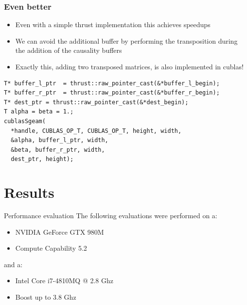 \documentclass{beamer}
\begin{document}
\begin{frame}[fragile]
  \frametitle{Even better}
  \begin{itemize}
    \item Even with a simple thrust implementation this achieves speedups
    \item We can avoid the additional buffer by performing the transposition
      during the addition of the causality buffers
    \item Exactly this, adding two transposed matrices, is also implemented
      in cublas!
  \end{itemize}
  \begin{lstlisting}[basicstyle=\tiny]
T* buffer_l_ptr  = thrust::raw_pointer_cast(&*buffer_l_begin);
T* buffer_r_ptr  = thrust::raw_pointer_cast(&*buffer_r_begin);
T* dest_ptr = thrust::raw_pointer_cast(&*dest_begin);
T alpha = beta = 1.;
cublasSgeam(
  *handle, CUBLAS_OP_T, CUBLAS_OP_T, height, width,
  &alpha, buffer_l_ptr, width,
  &beta, buffer_r_ptr, width,
  dest_ptr, height);
  \end{lstlisting}
\end{frame}

\section{Results} 
\begin{frame}{Performance evaluation}
  The following evaluations were performed on a:
  \begin{itemize}
    \item NVIDIA GeForce GTX 980M
    \item Compute Capability 5.2
  \end{itemize}
  and a:
  \begin{itemize}
    \item Intel Core i7-4810MQ @ 2.8 Ghz
    \item Boost up to 3.8 Ghz
  \end{itemize}
\end{frame} 
\end{document}
